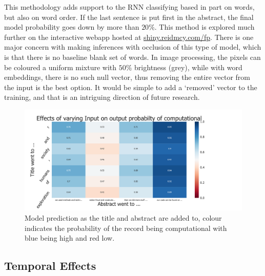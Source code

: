 \documentclass[12pt, a4paper]{article}
\begin{document}
This methodology adds support to the RNN classifying based in part on words, but also on word order. If the last sentence is put first in the abstract, the final model probability goes down by more than $20\%$. This method is explored much further on the interactive webapp hosted at \href{shiny.reidmcy.com/fp}{shiny.reidmcy.com/fp}. There is one major concern with making inferences with occlusion of this  type of model, which is that there is no baseline blank set of words. In image processing, the pixels can be coloured a uniform mixture with $50\%$ brightness (grey), while with word embeddings, there is no such null vector, thus removing the entire vector from the input is the best option. It would be simple to add a `removed' vector to the training, and that is an intriguing direction of future research.  

\begin{figure}[H]
	\centering
	\includegraphics[width=1\textwidth]{occ}
	\caption{Model prediction as the title and abstract are added to, colour indicates the probability of the record being computational with blue being high and red low.}\label{oc1}
\end{figure}

\subsection{Temporal Effects}
\end{document}
